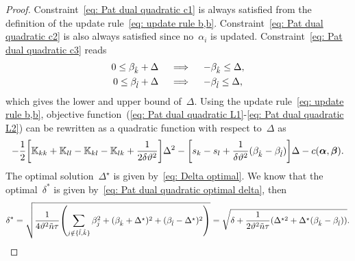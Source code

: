 \begin{proof}
  Constraint~\eqref{eq: Pat dual quadratic c1} is always satisfied from the definition of the update rule~\eqref{eq: update rule b,b}. Constraint~\eqref{eq: Pat dual quadratic c2} is also always satisfied since no~$\alpha_i$ is updated. Constraint~\eqref{eq: Pat dual quadratic c3} reads
  \begin{align*}
    0 \leq \beta_{\hat{k}} + \Delta
    & \quad \implies \quad
    - \beta_{\hat{k}} \leq \Delta, \\
    0 \leq \beta_{\hat{l}} + \Delta
    & \quad \implies \quad
    - \beta_{\hat{l}} \leq \Delta, \\
  \end{align*}
  which gives the lower and upper bound of~$\Delta.$ Using the update rule~\eqref{eq: update rule b,b}, objective function~(\ref{eq: Pat dual quadratic L1}-\ref{eq: Pat dual quadratic L2}) can be rewritten as a quadratic function with respect to~$\Delta$ as
  \begin{equation*}
    - \frac{1}{2} \Brac[s]{\K_{kk} + \K_{ll} - \K_{kl} - \K_{lk} + \frac{1}{2\delta\vartheta^2}} \Delta^2
    - \Brac[s]{s_k - s_l + \frac{1}{\delta\vartheta^2}(\betak - \betal)} \Delta
    - c(\bm{\alpha}, \bm{\beta}).
  \end{equation*}
  The optimal solution~$\Delta^{\star}$ is given by~\eqref{eq: Delta optimal}.   We know that the optimal~$\delta^*$ is given by~\eqref{eq: Pat dual quadratic optimal delta}, then
  \begin{equation*}
    \delta^*
      = \sqrt{\frac{1}{4\vartheta^2 \ntil \tau} \Brac{\sum_{j \notin \{\hat{l}, \hat{k}\}} \beta_j^2 + (\betak + \Delta^\star)^2 + (\betal - \Delta^\star)^2}} 
      = \sqrt{\delta + \frac{1}{2\vartheta^2 \ntil \tau} (\Delta^{\star2} + \Delta^\star (\betak - \betal))}.
  \end{equation*}
\end{proof}